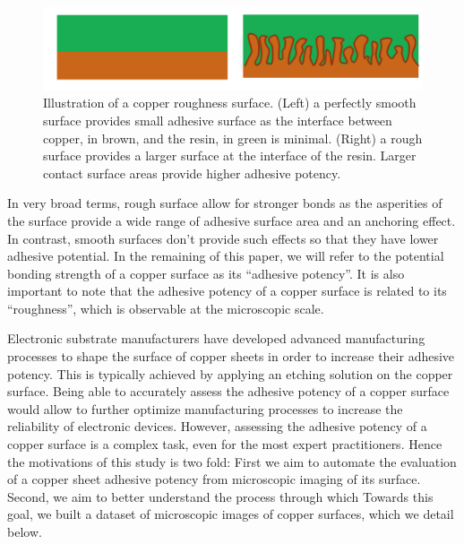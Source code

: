 \documentclass[10pt,twocolumn,letterpaper]{article}
\begin{document}
\begin{figure}[h]
\centering
\includegraphics[width=0.9\linewidth]{"./figures/Figure2"}
\caption{
Illustration of a copper roughness surface. 
(Left) a perfectly smooth surface provides small adhesive surface 
as the interface between copper, in brown, and the resin, in green is minimal. 
(Right) a rough surface provides a larger surface at the interface of the resin. 
Larger contact surface areas provide higher adhesive potency.
}
\end{figure}

In very broad terms, rough surface allow for stronger bonds 
as the asperities of the surface provide a wide range of adhesive surface area and an anchoring effect. 
In contrast, smooth surfaces don’t provide such effects so that they have lower adhesive potential. 
In the remaining of this paper, we will refer to the potential bonding strength of a copper surface as its ``adhesive potency''.
It is also important to note that the adhesive potency of a copper surface is related to its ``roughness'', 
which is observable at the microscopic scale.

Electronic substrate manufacturers have developed advanced manufacturing processes to shape the surface of copper sheets in order to increase their adhesive potency. 
This is typically achieved by applying an etching solution on the copper surface.
Being able to accurately assess the adhesive potency of a copper surface would 
allow to further optimize manufacturing processes to increase the reliability of electronic devices.
However, assessing the adhesive potency of a copper surface is a complex task, even for the most expert practitioners. 
Hence the motivations of this study is two fold: 
First we aim to automate the evaluation of a copper sheet adhesive potency from microscopic imaging of its surface. 
Second, we aim to better understand the process through which  
Towards this goal, we built a dataset of microscopic images of copper surfaces, which we detail below.
\end{document}
